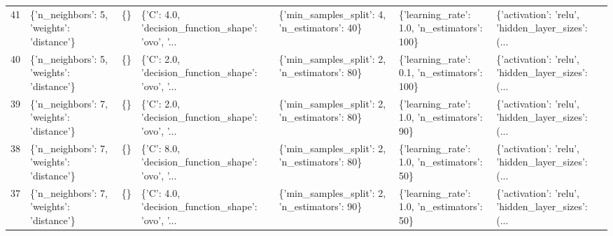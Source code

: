 \begin{tabular}{lllllll}
41  &  \{'n\_neighbors': 5, 'weights': 'distance'\} &  \{\} &  \{'C': 4.0, 'decision\_function\_shape': 'ovo', '... &   \{'min\_samples\_split': 4, 'n\_estimators': 40\} &  \{'learning\_rate': 1.0, 'n\_estimators': 100\} &  \{'activation': 'relu', 'hidden\_layer\_sizes': (... \\
40  &  \{'n\_neighbors': 5, 'weights': 'distance'\} &  \{\} &  \{'C': 2.0, 'decision\_function\_shape': 'ovo', '... &   \{'min\_samples\_split': 2, 'n\_estimators': 80\} &  \{'learning\_rate': 0.1, 'n\_estimators': 100\} &  \{'activation': 'relu', 'hidden\_layer\_sizes': (... \\
39  &  \{'n\_neighbors': 7, 'weights': 'distance'\} &  \{\} &  \{'C': 2.0, 'decision\_function\_shape': 'ovo', '... &   \{'min\_samples\_split': 2, 'n\_estimators': 80\} &   \{'learning\_rate': 1.0, 'n\_estimators': 90\} &  \{'activation': 'relu', 'hidden\_layer\_sizes': (... \\
38  &  \{'n\_neighbors': 7, 'weights': 'distance'\} &  \{\} &  \{'C': 8.0, 'decision\_function\_shape': 'ovo', '... &   \{'min\_samples\_split': 2, 'n\_estimators': 80\} &   \{'learning\_rate': 1.0, 'n\_estimators': 50\} &  \{'activation': 'relu', 'hidden\_layer\_sizes': (... \\
37  &  \{'n\_neighbors': 7, 'weights': 'distance'\} &  \{\} &  \{'C': 4.0, 'decision\_function\_shape': 'ovo', '... &   \{'min\_samples\_split': 2, 'n\_estimators': 90\} &   \{'learning\_rate': 1.0, 'n\_estimators': 50\} &  \{'activation': 'relu', 'hidden\_layer\_sizes': (... \\
\bottomrule
\end{tabular}
